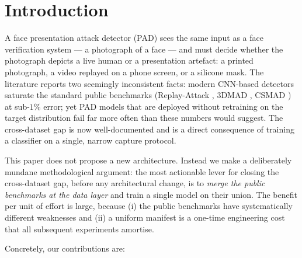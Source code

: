 \documentclass[anonymous, manuscript, screen, review]{acmart}
\begin{document}

\maketitle

\section{Introduction}
\label{sec:intro}

A face presentation attack detector (PAD) sees the same input as a face
verification system --- a photograph of a face --- and must decide
whether the photograph depicts a live human or a presentation
artefact: a printed photograph, a video replayed on a phone screen,
or a silicone mask. The literature reports two seemingly inconsistent
facts: modern CNN-based detectors saturate the standard public
benchmarks (Replay-Attack \cite{anjos2011replay}, 3DMAD
\cite{erdogmus20143dmad}, CSMAD \cite{bhattacharjee2018csmad})
at sub-$1\%$ error; yet PAD models that are deployed without
retraining on the target distribution fail far more often than these
numbers would suggest. The cross-dataset gap is now well-documented
and is a direct consequence of training a classifier on a single,
narrow capture protocol.

This paper does not propose a new architecture. Instead we make a
deliberately mundane methodological argument: the most actionable lever
for closing the cross-dataset gap, before any architectural change,
is to \emph{merge the public benchmarks at the data layer} and train a
single model on their union. The benefit per unit of effort is large,
because (i) the public benchmarks have systematically different
weaknesses and (ii) a uniform manifest is a one-time engineering cost
that all subsequent experiments amortise.

Concretely, our contributions are:
\end{document}
